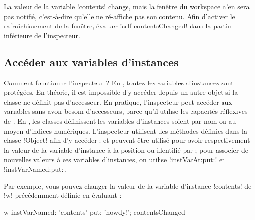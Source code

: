 \documentclass[a4paper,10pt,twoside]{book}
\begin{document}
La valeur de la variable \ct!contents! change, mais la fenêtre du workspace n'en sera pas notifié, c'est-à-dire qu'elle ne ré-affiche pas son contenu.
Afin d'activer le rafraîchissement de la fenêtre, évaluer \ct!self contentsChanged! dans la partie inférieure de l'inspecteur.

\subsection{Accéder aux variables d'instances}

Comment fonctionne l'inspecteur ?
En \st, toutes les variables d'instances sont protégées.
En théorie, il est impossible d'y accéder depuis un autre objet si la classe ne définit pas d'accesseur.
En pratique, l'inspecteur peut accéder aux variables sans avoir besoin d'accesseurs, parce qu'il utilise les capacités réflexives de \st.
En \st, les classes définissent les variables d'instances soient par nom ou au moyen d'indices numériques.
L'inspecteur utilisent des méthodes définies dans la classe \ct!Object! afin d'y accéder :   et  peuvent être utilisé pour avoir respectivement la valeur de la variable d'instance à la position  ou identifié par ; pour associer de nouvelles valeurs à ces variables d'instances, on utilise \ct!instVarAt:put:! et \ct!instVarNamed:put:!.

Par exemple, vous pouvez changer la valeur de la variable d'instance \ct!contents! de \ct!w! précédemment définie en évaluant :
\begin{code}{}
w instVarNamed: 'contents' put: 'howdy!'; contentsChanged
\end{code}

\end{document}
